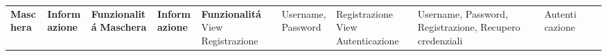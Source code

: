 \begin{center}




    \begin{adjustwidth}{-1.9cm}{0cm}
        \begin{longtable}
            {|>{\raggedright}m{3.5cm}|>{\raggedright}m{7.5cm}|>{\raggedright}m{3cm}|}
            \hline
            \n      {}
            \large \centering\textbf{Maschera}          & \centering\large\textbf{Informazione}                                                                                                                                                                                                                                                                                                                                                         & \large\textbf{Funzionalitá}
            \endfirsthead
            \hline      {}
            \large \centering\textbf{Maschera}          & \centering\large\textbf{Informazione}                                                                                                                                                                                                                                                                                                                                                         & \large\textbf{Funzionalitá}
            \endhead
            \hline  View Registrazione                  & Username, Password                                                                                                                                                                                                                                                                                                                                                                            & Registrazione
            \n      View Autenticazione                 & Username, Password, Registrazione, Recupero credenziali                                                                                                                                                                                                                                                                                                                                       & Autenticazione

\end{longtable}
\end{adjustwidth}
\end{center}
